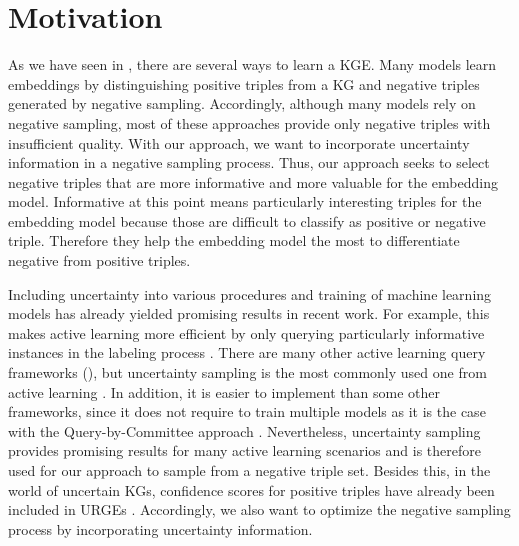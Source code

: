 \section{Motivation} 
\label{sec:motivation}


As we have seen in , there are several ways to learn a \ac{KGE}.
Many models learn embeddings by distinguishing positive triples from a \ac{KG} and negative triples generated by negative sampling.
Accordingly, although many models rely on negative sampling, most of these approaches provide only negative triples with insufficient quality.
With our approach, we want to incorporate uncertainty information in a negative sampling process.
Thus, our approach seeks to select negative triples that are more informative and more valuable for the embedding model.
Informative at this point means particularly interesting triples for the embedding model because those are difficult to classify as positive or negative triple.
Therefore they help the embedding model the most to differentiate negative from positive triples.

Including uncertainty into various procedures and training of machine learning models has already yielded promising results in recent work.
For example, this makes active learning more efficient by only querying particularly informative instances in the labeling process .
There are many other active learning query frameworks (), but uncertainty  sampling is the most commonly used one from active learning \cite{Settles2009ActiveLL}.
In addition, it is easier to implement than some other frameworks, since it does not require to train multiple models as it is the case with the Query-by-Committee approach \cite{Settles2009ActiveLL}.
Nevertheless, uncertainty sampling provides promising results for many active learning scenarios and is therefore used for our approach to sample from a negative triple set.
Besides this, in the world of uncertain \acp{KG}, confidence scores for positive triples have already been included in \acp{URGE} \cite{UKGE}.
Accordingly, we also want to optimize the negative sampling process by incorporating uncertainty information.

